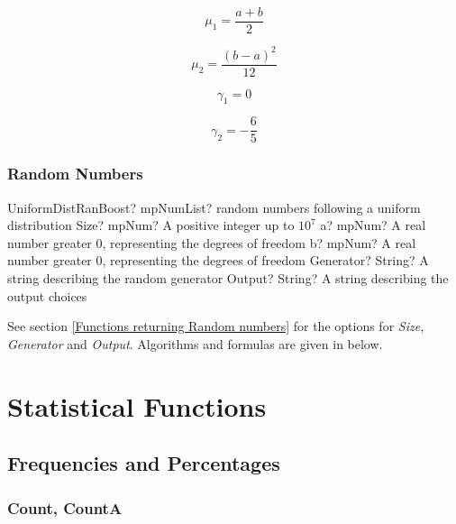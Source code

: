 \begin{equation} 
	\mu_1 = \frac{a+b}{2}
\end{equation}

\begin{equation} 
	\mu_2 = \frac{(b-a)^2}{12}
\end{equation}

\begin{equation} 
	\gamma_1 = 0
\end{equation}

\begin{equation} 
	\gamma_2 = -\frac{6}{5}
\end{equation}



\subsection{Random Numbers}

\begin{mpFunctionsExtract}
	\mpFunctionFiveNotImplemented
	{UniformDistRanBoost? mpNumList? random numbers following a uniform distribution}
	{Size? mpNum? A positive integer up to $10^7$}
	{a? mpNum? A real number greater 0, representing the degrees of freedom}
	{b? mpNum? A real number greater 0, representing the degrees of freedom}
	{Generator? String? A string describing the random generator}
	{Output? String? A string describing the output choices}
\end{mpFunctionsExtract}

\vspace{0.3cm}

See section \ref{Functions returning Random numbers} for the options for  {\itshape\sffamily Size},  {\itshape\sffamily Generator} and {\itshape\sffamily Output}. Algorithms and formulas are given in below.





\chapter{Statistical Functions}
\label{DescriptiveStatistics} 


\section{Frequencies and Percentages}


\subsection{Count, CountA}

